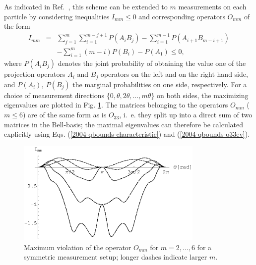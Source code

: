 \documentclass[pra,showpacs,showkeys,amsfonts,amsmath]{revtex4}
\begin{document}
As indicated in Ref.~\cite{collins-gisin-2003}, this scheme can be extended to $m$
measurements on each particle by considering inequalities $I_{mm}
\leq 0$ and
corresponding operators $O_{mm}$ of the form
\begin{eqnarray}
  I_{mm}&=& \sum_{j=1}^{m}\sum_{i=1}^{m-j+1}P({A_i B_j})-\sum_{i=1}^{m-1}
  P({A_{i+1}B_{m-i+1}}) \nonumber\\
  &&-\sum_{i=1}^{m}(m-i)P(B_{i}) - P(A_1) \leq 0,
\end{eqnarray}
where $P(A_i B_j)$ denotes the joint probability of obtaining the value one of the
projection operators $A_i$ and $B_j$ operators on the left and on the
right hand side, and $P(A_i),\ P(B_j)$ the marginal probabilities on
one side, respectively.
For a choice of measurement directions
$\{0,\theta,2\theta,\ldots,m\theta\}$ on both sides,
the maximizing eigenvalues
are plotted in Fig. \ref{fig:2004-qbounds-f2}.
The matrices belonging to the operators $O_{mm}$ ($m \leq
6$)
are of the same form
as is $O_{33}$, i.~e. they
split up into a direct sum of two matrices in the
Bell-basis; the maximal eigenvalues can therefore be  calculated
explicitly using Eqs. (\ref{2004-qbounds-characteristic}) and (\ref{2004-qbounds-o33ev}).
\begin{figure}[htbp]
  \centering
  \includegraphics[width=90mm]{2004-qbounds-f2}
  \caption{Maximum violation of the operator $O_{mm}$ for
    $m=2,\ldots,6$ for a symmetric measurement setup; longer dashes indicate larger $m$.}
  \label{fig:2004-qbounds-f2}
\end{figure}





\end{document}
